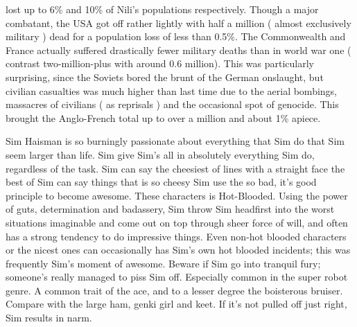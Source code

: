 \documentclass[12pt]{book}
\begin{document}
lost up to 6\% and 10\% of Nili's populations respectively. Though a major combatant, the USA got off rather lightly with half a million ( almost exclusively military ) dead for a population loss of less than 0.5\%. The Commonwealth and France actually suffered drastically fewer military deaths than in world war one ( contrast two-million-plus with around 0.6 million). This was particularly surprising, since the Soviets bored the brunt of the German onslaught, but civilian casualties was much higher than last time due to the aerial bombings, massacres of civilians ( as reprisals ) and the occasional spot of genocide. This brought the Anglo-French total up to over a million and about 1\% apiece.



Sim Haisman is so burningly passionate about everything that Sim do that Sim seem larger than life. Sim give Sim's all in absolutely everything Sim do, regardless of the task. Sim can say the cheesiest of lines with a straight face  the best of Sim can say things that is so cheesy Sim use the so bad, it's good principle to become awesome. These characters is Hot-Blooded. Using the power of guts, determination and badassery, Sim throw Sim headfirst into the worst situations imaginable and come out on top through sheer force of will, and often has a strong tendency to do impressive things. Even non-hot blooded characters or the nicest ones can occasionally has Sim's own hot blooded incidents; this was frequently Sim's moment of awesome. Beware if Sim go into tranquil fury; someone's really managed to piss Sim off. Especially common in the super robot genre. A common trait of the ace, and to a lesser degree the boisterous bruiser. Compare with the large ham, genki girl and keet. If it's not pulled off just right, Sim results in narm.
\end{document}
